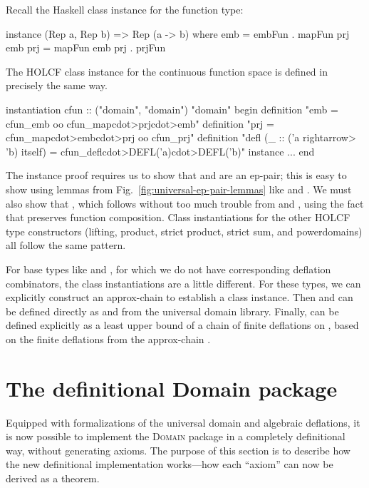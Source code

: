 Recall the Haskell  class instance for the function type:
%
\begin{hscode}
instance (Rep a, Rep b) => Rep (a -> b) where
  emb = embFun . mapFun prj emb
  prj = mapFun emb prj . prjFun
\end{hscode}
%
The HOLCF  class instance for the continuous function space is defined in precisely the same way.
%
\begin{isacode}
instantiation cfun :: ("domain", "domain") "domain"
begin
  definition "emb = cfun_emb oo cfun_map\<cdot>prj\<cdot>emb"
  definition "prj = cfun_map\<cdot>emb\<cdot>prj oo cfun_prj"
  definition "defl (_ :: ('a \<rightarrow> 'b) itself) = cfun_defl\<cdot>DEFL('a)\<cdot>DEFL('b)"
  instance ...
end
\end{isacode}
%
The instance proof requires us to show that  and  are an ep-pair; this is easy to show using lemmas from Fig.~\ref{fig:universal-ep-pair-lemmas} like  and . We must also show that , which follows without too much trouble from  and , using the fact that  preserves function composition. Class instantiations for the other HOLCF type constructors (lifting, product, strict product, strict sum, and powerdomains) all follow the same pattern.

For base types like  and , for which we do not have corresponding deflation combinators, the class instantiations are a little different. For these types, we can explicitly construct an approx-chain  to establish a  class instance. Then  and  can be defined directly as  and  from the universal domain library. Finally,  can be defined explicitly as a least upper bound of a chain of finite deflations on , based on the finite deflations from the approx-chain .

\section{The definitional Domain package}
\label{sec:universal-package}

Equipped with formalizations of the universal domain and algebraic deflations, it is now possible to implement the \textsc{Domain} package in a completely definitional way, without generating axioms. The purpose of this section is to describe how the new definitional implementation works---how each ``axiom'' can now be derived as a theorem.

